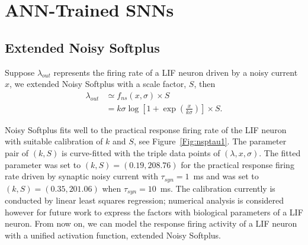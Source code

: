 \documentclass{article}
\begin{document}


\section{ANN-Trained SNNs}	

\subsection{Extended Noisy Softplus}
\label{sec:af_model}
Suppose $\lambda_{out}$ represents the firing rate  of a LIF neuron driven by a noisy current $x$, we extended Noisy Softplus\cite{Noisysoftplus} with a scale factor, $S$, then
\begin{equation}
\begin{aligned}
\lambda_{out} &\simeq f_{ns}(x, \sigma) \times S\\
&=k \sigma \log [1 + \exp(\frac{x}{k \sigma})] \times S.
\end{aligned}
\label{equ:fit}
\end{equation}	

Noisy Softplus fits well to the practical response firing rate of the LIF neuron with suitable calibration of $k$ and $S$, see Figure~\ref{Fig:nsptau1}.
The parameter pair of $(k, S)$ is curve-fitted with the triple data points of $(\lambda, x, \sigma)$.
The fitted parameter was set to $(k, S)=(0.19,208.76)$ for the practical response firing rate driven by synaptic noisy current with $\tau_{syn}=1$~ms and was set to $(k, S)=(0.35,201.06)$ when $\tau_{syn}=10$~ms.
The calibration currently is conducted by linear least squares regression; numerical analysis is considered however for future work to express the factors with biological parameters of a LIF neuron. From now on, we can model the response firing activity of a LIF neuron with a unified activation function, extended Noisy Softplus.
\end{document}
